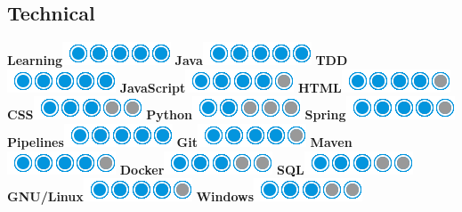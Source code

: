 \documentclass[]{friggeri-cv}
\begin{document}
\begin{aside}
  \section{Technical}
  \hspace{1cm}
    \textbf{Learning}\includegraphics[scale=0.40]{img/5puces.png}
    \textbf{Java}\includegraphics[scale=0.40]{img/5puces.png}
    \textbf{TDD}\includegraphics[scale=0.40]{img/5puces.png}
    \textbf{JavaScript}\includegraphics[scale=0.40]{img/4puces.png}
    \textbf{HTML}\includegraphics[scale=0.40]{img/4puces.png}
    \textbf{CSS}\includegraphics[scale=0.40]{img/3puces.png}
    \textbf{Python}\includegraphics[scale=0.40]{img/2puces.png}
    \textbf{Spring}\includegraphics[scale=0.40]{img/4puces.png}
    \textbf{Pipelines}\includegraphics[scale=0.40]{img/5puces.png}
    \textbf{Git}\includegraphics[scale=0.40]{img/4puces.png}
    \textbf{Maven}\includegraphics[scale=0.40]{img/4puces.png}
    \textbf{Docker}\includegraphics[scale=0.40]{img/3puces.png}
    \textbf{SQL}\includegraphics[scale=0.40]{img/3puces.png}
    \textbf{GNU/Linux}\includegraphics[scale=0.40]{img/4puces.png}
    \textbf{Windows}\includegraphics[scale=0.40]{img/3puces.png}
    ~

\end{aside}
\end{document}
